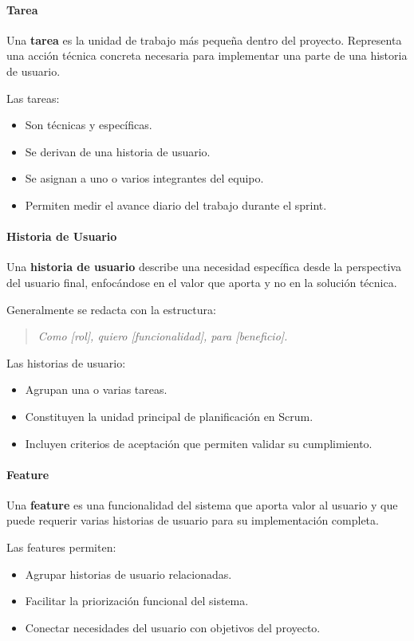 \documentclass[12pt]{article}
\begin{document}
\paragraph{Tarea}

Una \textbf{tarea} es la unidad de trabajo más pequeña dentro del proyecto. Representa una acción técnica concreta necesaria para implementar una parte de una historia de usuario.

Las tareas:
\begin{itemize}
    \item Son técnicas y específicas.
    \item Se derivan de una historia de usuario.
    \item Se asignan a uno o varios integrantes del equipo.
    \item Permiten medir el avance diario del trabajo durante el sprint.
\end{itemize}

\paragraph{Historia de Usuario}

Una \textbf{historia de usuario} describe una necesidad específica desde la perspectiva del usuario final, enfocándose en el valor que aporta y no en la solución técnica.

Generalmente se redacta con la estructura:
\begin{quote}
\textit{Como [rol], quiero [funcionalidad], para [beneficio].}
\end{quote}

Las historias de usuario:
\begin{itemize}
    \item Agrupan una o varias tareas.
    \item Constituyen la unidad principal de planificación en Scrum.
    \item Incluyen criterios de aceptación que permiten validar su cumplimiento.
\end{itemize}

\paragraph{Feature}

Una \textbf{feature} es una funcionalidad del sistema que aporta valor al usuario y que puede requerir varias historias de usuario para su implementación completa.

Las features permiten:
\begin{itemize}
    \item Agrupar historias de usuario relacionadas.
    \item Facilitar la priorización funcional del sistema.
    \item Conectar necesidades del usuario con objetivos del proyecto.
\end{itemize}
\end{document}
